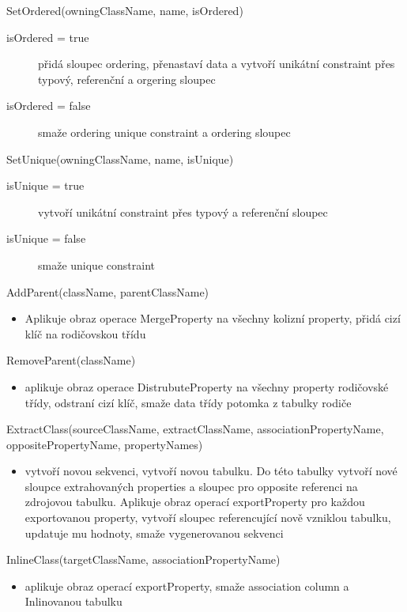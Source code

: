 \documentclass[11pt,twoside,a4paper]{book}
\begin{document}
\begin{list}{Operace :}{}
  \item SetOrdered(owningClassName, name, isOrdered)
  \begin{description}
  	\item[isOrdered = true] přidá sloupec ordering, přenastaví data a vytvoří
  	unikátní constraint přes typový, referenční a orgering sloupec
	\item[isOrdered = false] smaže ordering unique constraint a ordering sloupec 
  \end{description}

  \item SetUnique(owningClassName, name, isUnique)
  \begin{description}
  	\item[isUnique = true] vytvoří unikátní constraint přes typový a referenční
  	sloupec
	\item[isUnique = false] smaže unique constraint
  \end{description}
  
  \item AddParent(className, parentClassName)
  \begin{itemize}
    \item Aplikuje obraz operace MergeProperty na všechny kolizní property,
	přidá cizí klíč na rodičovskou třídu
  \end{itemize}

  \item RemoveParent(className)
  \begin{itemize}
    \item aplikuje obraz operace DistrubuteProperty na všechny property
	rodičovské třídy, odstraní cizí klíč, smaže data třídy potomka z tabulky
	rodiče
  \end{itemize}

  \item ExtractClass(sourceClassName, extractClassName, associationPropertyName,
  oppositePropertyName, propertyNames)
  \begin{itemize}
    \item vytvoří novou sekvenci, vytvoří novou
    tabulku. Do této tabulky vytvoří nové sloupce extrahovaných properties a 
    sloupec pro opposite referenci na zdrojovou tabulku. Aplikuje obraz operací
    exportProperty pro každou exportovanou property, vytvoří sloupec
    referencující nově vzniklou tabulku, updatuje mu hodnoty, smaže
    vygenerovanou sekvenci
  \end{itemize}
  
  \item InlineClass(targetClassName, associationPropertyName)
  \begin{itemize}
    \item aplikuje obraz operací exportProperty, smaže association column a
	Inlinovanou tabulku
  \end{itemize}


\end{list}
\end{document}
